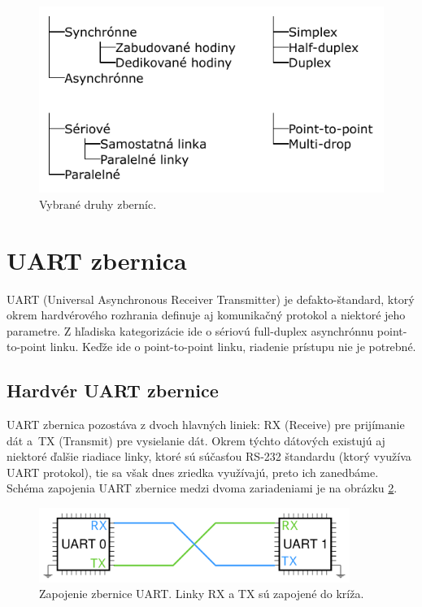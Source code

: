 \begin{figure}
    \centerline{\includegraphics[width=1\textwidth]{images/busTree.pdf}}
    \caption[Vybrané typy zberníc]{Vybrané druhy zberníc.}
    \label{obr:busTree}
\end{figure}

\section{UART zbernica}
UART (Universal Asynchronous Receiver Transmitter) je defakto-štandard, ktorý okrem hardvérového rozhrania definuje aj komunikačný protokol a niektoré jeho parametre. Z hľadiska kategorizácie ide o sériovú full-duplex asynchrónnu point-to-point linku. Keďže ide o point-to-point linku, riadenie prístupu nie je potrebné.

\subsection{Hardvér UART zbernice}
UART zbernica pozostáva z dvoch hlavných liniek: RX (Receive) pre prijímanie dát a~TX (Transmit) pre vysielanie dát. Okrem týchto dátových existujú aj niektoré ďalšie riadiace linky, ktoré sú súčasťou RS-232 štandardu \cite{rs232Spec} (ktorý využíva UART protokol), tie sa však dnes zriedka využívajú, preto ich zanedbáme. Schéma zapojenia UART zbernice medzi dvoma zariadeniami je na obrázku \ref{obr:uartWiring}.

\begin{figure}
    \centerline{\includegraphics[width=0.9\textwidth]{images/uartWiring.pdf}}
    \caption[Zapojenie zbernice UART]{Zapojenie zbernice UART. Linky RX a TX sú zapojené do kríža.}
    \label{obr:uartWiring}
\end{figure}

